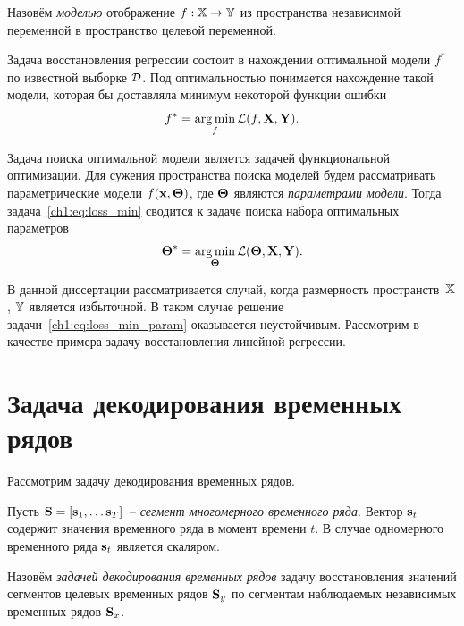 \begin{definition}
Назовём \textit{моделью} отображение $f: \mathbb{X} \rightarrow \mathbb{Y}$ из пространства независимой переменной в пространство целевой переменной.
\end{definition}

Задача восстановления регрессии состоит в нахождении оптимальной модели $f^*$ по известной выборке $\mathcal{D}$. Под оптимальностью понимается нахождение такой модели, которая бы доставляла минимум некоторой функции ошибки
\begin{equation}
	f^* = \mathop{\arg \min}\limits_f \mathcal{L}(f, \mathbf{X}, \mathbf{Y}).
	\label{ch1:eq:loss_min}
\end{equation}

Задача поиска оптимальной модели является задачей функциональной оптимизации. 
Для сужения пространства поиска моделей будем рассматривать параметрические модели $f(\mathbf{x}, \boldsymbol{\Theta})$, где $\boldsymbol{\Theta}$ являются \textit{параметрами модели}. 
Тогда задача~\eqref{ch1:eq:loss_min} сводится к задаче поиска набора оптимальных параметров
\begin{equation}
\boldsymbol{\Theta}^* = \mathop{\arg \min}\limits_{\boldsymbol{\Theta}} \mathcal{L}(\boldsymbol{\Theta}, \mathbf{X}, \mathbf{Y}).
\label{ch1:eq:loss_min_param}
\end{equation}

В данной диссертации рассматривается случай, когда размерность пространств~$\mathbb{X}$, $\mathbb{Y}$ является избыточной. 
В таком случае решение задачи~\eqref{ch1:eq:loss_min_param} оказывается неустойчивым. 
Рассмотрим в качестве примера задачу восстановления линейной регрессии.

\section{Задача декодирования временных рядов}
\label{ch1:time_series}

Рассмотрим задачу декодирования временных рядов. 

\begin{definition}
Пусть $\mathbf{S} = [\mathbf{s}_1, \dots \mathbf{s}_T]$~-- \textit{сегмент многомерного временного ряда}.
Вектор $\mathbf{s}_t$ содержит значения временного ряда в момент времени $t$. 
В случае одномерного временного ряда $\mathbf{s}_t$ является скаляром.
\end{definition}

\begin{definition}
	Назовём \textit{задачей декодирования временных рядов} задачу восстановления значений сегментов целевых временных рядов $\mathbf{S}_y$ по сегментам наблюдаемых независимых временных рядов $\mathbf{S}_x$.
\end{definition}

